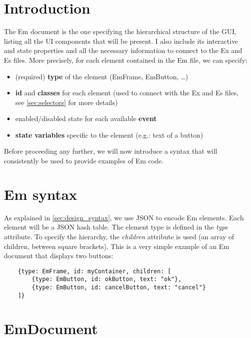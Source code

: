 
\section{Introduction}

The Em document is the one specifying the hierarchical structure of the GUI, listing all the UI components that will be present.
I also include its interactive and state properties and all the necessary information to connect to the Ex and Es files. More precisely, for each element contained in the Em file, we can specify:

\begin{itemize}
    \item (required) \textbf{type} of the element (EmFrame, EmButton, \ldots)
    \item \textbf{id} and \textbf{classes} for each element (used to connect with the Ex and Es files, see \ref{sec:selectors} for more details)
    \item enabled/disabled state for each available \textbf{event}
    \item \textbf{state variables} specific to the element (e.g.: text of a button)
\end{itemize}

Before proceeding any further, we will now introduce a syntax that will consistently be used to provide examples of Em code.

\section{Em syntax}

As explained in \ref{sec:design_syntax}, we use JSON to encode Em elements. Each element will be a JSON hash table. The element type is defined in the \textit{type} attribute. To specify the hierarchy, the \textit{children} attribute is used (an array of children, between square brackets). This is a very simple example of an Em document that displays two buttons:

\begin{verbatim}
    {type: EmFrame, id: myContainer, children: [
        {type: EmButton, id: okButton, text: "ok"},
        {type: EmButton, id: cancelButton, text: "cancel"}
    ]}
\end{verbatim}

\section{EmDocument}

